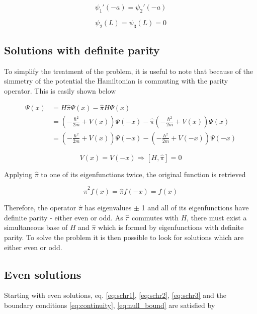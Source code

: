 \documentclass{article}
\begin{document}
\begin{equation}
\psi_{1}'(-a) =  \psi_{2}'(-a)
\end{equation}

\begin{equation}
\label{eq:null_bound}
\psi_{2}(L) =  \psi_{3}(L) = 0
\end{equation}

\subsection{Solutions with definite parity}
To simplify the treatment of the problem, it is useful to note that because of the simmetry of the potential the Hamiltonian is commuting with the parity operator. This is easily shown below

\begin{align*}
[H, \hat{\pi}] \Psi(x) & = H \hat{\pi} \Psi(x) - \hat{\pi} H \Psi(x) \\ 
  & = \left(-\frac{\hbar^2}{2m} + V(x)\right)\Psi(-x) -  \hat{\pi} \left(-\frac{\hbar^2}{2m} + V(x)\right)\Psi(x) \\ & = \left(-\frac{\hbar^2}{2m} + V(x)\right)\Psi(-x) -  \left(-\frac{\hbar^2}{2m} + V(-x)\right)\Psi(-x)
\end{align*}

\begin{equation}
\label{eq:parity_commutation}
V(x) = V(-x) \Rightarrow \left[H,\hat{\pi} \right] = 0
\end{equation}

Applying \(\hat{\pi}\) to one of its eigenfunctions twice, the original function is retrieved

\begin{equation}
\hat{\pi}^2f(x) = \hat{\pi}f(-x) = f(x)
\end{equation}

Therefore, the operator \(\hat{\pi}\) has eigenvalues \(\pm\) 1 and all of its eigenfunctions have definite parity - either even or odd. As \(\hat{\pi}\) commutes with \(H\), there must exist a simultaneous base of \(H\) and \(\hat{\pi}\) which is formed by eigenfunctions with definite parity. To solve the problem it is then possible to look for solutions which are either even or odd.

\subsection{Even solutions}
Starting with even solutions, eq. \eqref{eq:schr1}, \eqref{eq:schr2}, \eqref{eq:schr3} and the boundary conditions \eqref{eq:continuity}, \eqref{eq:null_bound} are satisfied by
\end{document}
